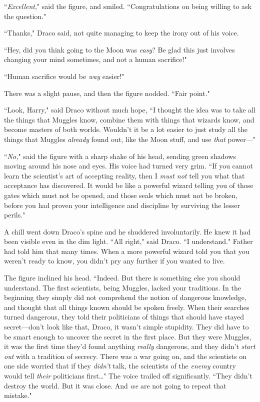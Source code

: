 ``\emph{Excellent}," said the figure, and smiled. ``Congratulations on being willing to ask the question."

``Thanks," Draco said, not quite managing to keep the irony out of his voice.

``Hey, did you think going to the Moon was \emph{easy}? Be glad this just involves changing your mind sometimes, and not a human sacrifice!"

``Human sacrifice would be \emph{way} easier!"

There was a slight pause, and then the figure nodded. ``Fair point."

``Look, Harry," said Draco without much hope, ``I thought the idea was to take all the things that Muggles know, combine them with things that wizards know, and become masters of both worlds. Wouldn't it be a lot easier to just study all the things that Muggles \emph{already} found out, like the Moon stuff, and use \emph{that} power—"

``\emph{No,}" said the figure with a sharp shake of his head, sending green shadows moving around his nose and eyes. His voice had turned very grim. ``If you cannot learn the scientist's art of accepting reality, then I \emph{must not} tell you what that acceptance has discovered. It would be like a powerful wizard telling you of those gates which must not be opened, and those seals which must not be broken, before you had proven your intelligence and discipline by surviving the lesser perils."

A chill went down Draco's spine and he shuddered involuntarily. He knew it had been visible even in the dim light. ``All right," said Draco. ``I understand." Father had told him that many times. When a more powerful wizard told you that you weren't ready to know, you didn't pry any further if you wanted to live.

The figure inclined his head. ``Indeed. But there is something else you should understand. The first scientists, being Muggles, lacked your traditions. In the beginning they simply did not comprehend the notion of dangerous knowledge, and thought that all things known should be spoken freely. When their searches turned dangerous, they told their politicians of things that should have stayed secret—don't look like that, Draco, it wasn't simple stupidity. They did have to be smart enough to uncover the secret in the first place. But they were Muggles, it was the first time they'd found anything \emph{really} dangerous, and they didn't \emph{start out} with a tradition of secrecy. There was a war going on, and the scientists on one side worried that if they \emph{didn't} talk, the scientists of the \emph{enemy} country would tell \emph{their} politicians first{\ldots}" The voice trailed off significantly. ``They didn't destroy the world. But it was close. And \emph{we} are not going to repeat that mistake."

